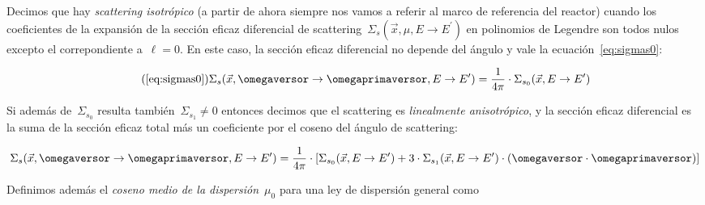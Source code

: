 \begin{definicion}
 Decimos que hay \emph{scattering isotrópico} (a partir de ahora siempre nos vamos a referir al marco de referencia del reactor) cuando los coeficientes de la expansión de la sección eficaz diferencial de scattering~$\Sigma_s(\vec{x}, \mu,  E \rightarrow E^\prime)$ en polinomios de Legendre son todos nulos excepto el correpondiente a~$\ell=0$. En este caso, la sección eficaz diferencial no depende del ángulo y vale la ecuación~\eqref{eq:sigmas0}:

\begin{equation}\tag{\ref{eq:sigmas0}}
 \Sigma_s(\vec{x}, \omegaversor \rightarrow \omegaprimaversor, E \rightarrow E^{\prime}) = \frac{1}{4\pi} \cdot \Sigma_{s_0}(\vec{x}, E \rightarrow E^{\prime})
\end{equation}

Si además de~$\Sigma_{s_0}$ resulta también~$\Sigma_{s_1}\neq 0$ entonces decimos que el scattering es \emph{linealmente anisotrópico}, y la sección eficaz diferencial es la suma de la sección eficaz total más un coeficiente por el coseno del ángulo de scattering:

\begin{equation}
\label{eq:scatteringanisotropico}
 \Sigma_s(\vec{x}, \omegaversor \rightarrow \omegaprimaversor, E \rightarrow E^{\prime}) = \frac{1}{4\pi} \cdot \left[ \Sigma_{s_0}(\vec{x}, E \rightarrow E^{\prime}) + 3 \cdot  \Sigma_{s_1}(\vec{x}, E \rightarrow E^{\prime}) \cdot \left ( \omegaversor \cdot \omegaprimaversor \right) \right] 
\end{equation}

Definimos además el \emph{coseno medio de la dispersión}~$\mu_0$ para una ley de dispersión general como




\end{definicion}
